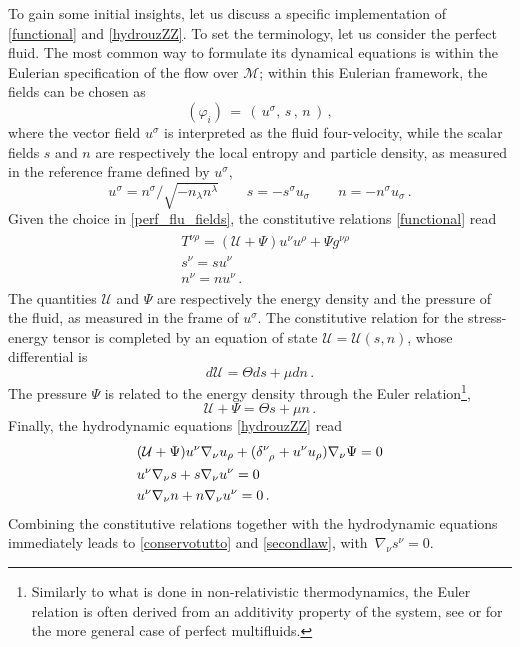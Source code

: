 \documentclass[a4paper, amsfonts, amssymb, amsmath, reprint, twocolumn, showkeys, nofootinbib]{revtex4-2}
\begin{document}
To gain some initial insights, let us discuss a specific implementation of \eqref{functional} and \eqref{hydrouzZZ}. 
To set the terminology, let us consider the perfect fluid. The most common way to formulate its dynamical equations is within the Eulerian specification of the flow over $\mathcal{M}$; within this Eulerian framework, the fields can be chosen as
\begin{equation}
\label{perf_flu_fields}
(\varphi_i) \, =  \, ( \, u^\sigma   , \, s \, , \, n \, ) \, ,
\end{equation} 
where  the vector field $u^\sigma$ is interpreted as the fluid four-velocity, while the scalar fields $s$ and $n$ are respectively the local entropy and particle density, as measured in the reference frame defined by $u^\sigma$,
\begin{equation}\label{tuttiCampi}
 u^\sigma =  {n^\sigma}/{\sqrt{-n_\lambda n^\lambda}} 
\quad \quad 
s=-s^\sigma u_\sigma  
\quad \quad
n=-n^\sigma u_\sigma \, .
\end{equation}
Given the choice in \eqref{perf_flu_fields}, the constitutive relations \eqref{functional} read
\begin{align}
    \label{functional333}
    \begin{split}
& T^{\nu \rho} = (\mathcal{U}+\Psi)u^\nu u^\rho + \Psi g^{\nu \rho} 
 \\ 
& s^\nu = s u^\nu 
 \\
& n^\nu = n u^\nu \, . 
\end{split}
\end{align}
The quantities $\mathcal{U}$ and $\Psi$ are respectively the energy density and the pressure of the fluid, as measured in the frame of $u^\sigma$. The constitutive relation for the stress-energy tensor is completed by an equation of state $\mathcal{U}=\mathcal{U}(s,n)$, whose differential is
\begin{equation}
\label{EEEEOOS}
d\mathcal{U} = \Theta ds +\mu dn \, .
\end{equation}
The pressure $\Psi$ is related to the energy density through the Euler relation\footnote{Similarly to what is done in non-relativistic thermodynamics, the Euler relation is often derived from an additivity property of the system, see \citep{andersson2007review} or \citep{Termo} for the more general case of perfect multifluids.}, 
\begin{equation}\label{EULRELO}
\mathcal{U} + \Psi = \Theta s + \mu n \, .
\end{equation} 
Finally, the hydrodynamic equations \eqref{hydrouzZZ} read
\begin{equation}
\label{hydroequez}
\begin{split}
& (\mathcal{U}+\Psi) u^\nu \nabla_\nu u_\rho +(\delta\indices{^\nu _\rho}+u^\nu u_\rho) \nabla_\nu \Psi =0 \\
& u^\nu \nabla_\nu s + s \nabla_\nu u^\nu =0 \\
& u^\nu \nabla_\nu n + n \nabla_\nu u^\nu =0 \, .  
\end{split}
\end{equation}
Combining the constitutive relations together with the hydrodynamic equations immediately leads to \eqref{conservotutto} and \eqref{secondlaw}, with~$\nabla_\nu s^\nu =0$. 
\end{document}
